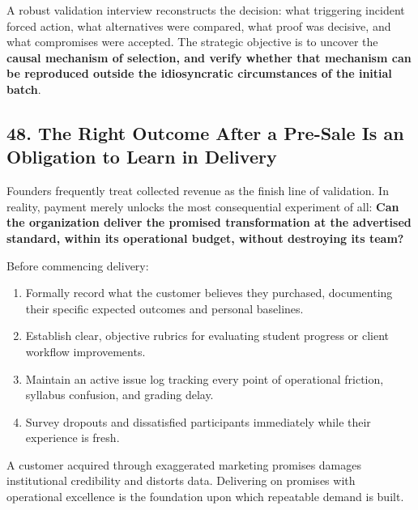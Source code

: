 A robust validation interview reconstructs the decision: what triggering incident forced action, what alternatives were compared, what proof was decisive, and what compromises were accepted. The strategic objective is to uncover the \textbf{causal mechanism of selection, and verify whether that mechanism can be reproduced outside the idiosyncratic circumstances of the initial batch}.

\subsection*{48. The Right Outcome After a Pre-Sale Is an Obligation to Learn in Delivery}

Founders frequently treat collected revenue as the finish line of validation. In reality, payment merely unlocks the most consequential experiment of all: \textbf{Can the organization deliver the promised transformation at the advertised standard, within its operational budget, without destroying its team?}

Before commencing delivery:
\begin{enumerate}
    \item Formally record what the customer believes they purchased, documenting their specific expected outcomes and personal baselines.
    \item Establish clear, objective rubrics for evaluating student progress or client workflow improvements.
    \item Maintain an active issue log tracking every point of operational friction, syllabus confusion, and grading delay.
    \item Survey dropouts and dissatisfied participants immediately while their experience is fresh.
\end{enumerate}

A customer acquired through exaggerated marketing promises damages institutional credibility and distorts data. Delivering on promises with operational excellence is the foundation upon which repeatable demand is built.
